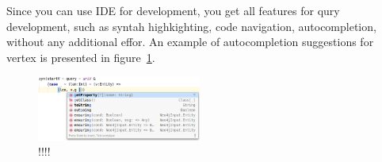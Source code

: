 Since you can use IDE for development, you get all features for qury development, such as syntah highkighting, code navigation, autocompletion, without any additional effor.
An example of autocompletion suggestions for vertex is presented in figure~\ref{fig:autocompletion}.

\begin{figure}[ht]
    \centering
    \includegraphics[width=0.48\textwidth]{pictures/image1.png}
    \caption{!!!!}
    \label{fig:autocompletion}
\end{figure}
